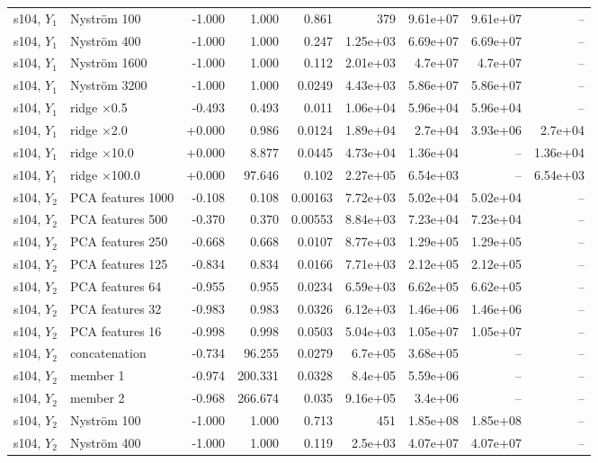 \begin{landscape}
{\begin{longtable}{llrrrrrrr}
s104, $Y_1$ & Nystr\"om 100 & -1.000 & 1.000 & 0.861 & 379 & 9.61e+07 & 9.61e+07 & -- \\
s104, $Y_1$ & Nystr\"om 400 & -1.000 & 1.000 & 0.247 & 1.25e+03 & 6.69e+07 & 6.69e+07 & -- \\
s104, $Y_1$ & Nystr\"om 1600 & -1.000 & 1.000 & 0.112 & 2.01e+03 & 4.7e+07 & 4.7e+07 & -- \\
s104, $Y_1$ & Nystr\"om 3200 & -1.000 & 1.000 & 0.0249 & 4.43e+03 & 5.86e+07 & 5.86e+07 & -- \\
s104, $Y_1$ & ridge $\times$0.5 & -0.493 & 0.493 & 0.011 & 1.06e+04 & 5.96e+04 & 5.96e+04 & -- \\
s104, $Y_1$ & ridge $\times$2.0 & +0.000 & 0.986 & 0.0124 & 1.89e+04 & 2.7e+04 & 3.93e+06 & 2.7e+04 \\
s104, $Y_1$ & ridge $\times$10.0 & +0.000 & 8.877 & 0.0445 & 4.73e+04 & 1.36e+04 & -- & 1.36e+04 \\
s104, $Y_1$ & ridge $\times$100.0 & +0.000 & 97.646 & 0.102 & 2.27e+05 & 6.54e+03 & -- & 6.54e+03 \\
s104, $Y_2$ & PCA features 1000 & -0.108 & 0.108 & 0.00163 & 7.72e+03 & 5.02e+04 & 5.02e+04 & -- \\
s104, $Y_2$ & PCA features 500 & -0.370 & 0.370 & 0.00553 & 8.84e+03 & 7.23e+04 & 7.23e+04 & -- \\
s104, $Y_2$ & PCA features 250 & -0.668 & 0.668 & 0.0107 & 8.77e+03 & 1.29e+05 & 1.29e+05 & -- \\
s104, $Y_2$ & PCA features 125 & -0.834 & 0.834 & 0.0166 & 7.71e+03 & 2.12e+05 & 2.12e+05 & -- \\
s104, $Y_2$ & PCA features 64 & -0.955 & 0.955 & 0.0234 & 6.59e+03 & 6.62e+05 & 6.62e+05 & -- \\
s104, $Y_2$ & PCA features 32 & -0.983 & 0.983 & 0.0326 & 6.12e+03 & 1.46e+06 & 1.46e+06 & -- \\
s104, $Y_2$ & PCA features 16 & -0.998 & 0.998 & 0.0503 & 5.04e+03 & 1.05e+07 & 1.05e+07 & -- \\
s104, $Y_2$ & concatenation & -0.734 & 96.255 & 0.0279 & 6.7e+05 & 3.68e+05 & -- & -- \\
s104, $Y_2$ & member 1 & -0.974 & 200.331 & 0.0328 & 8.4e+05 & 5.59e+06 & -- & -- \\
s104, $Y_2$ & member 2 & -0.968 & 266.674 & 0.035 & 9.16e+05 & 3.4e+06 & -- & -- \\
s104, $Y_2$ & Nystr\"om 100 & -1.000 & 1.000 & 0.713 & 451 & 1.85e+08 & 1.85e+08 & -- \\
s104, $Y_2$ & Nystr\"om 400 & -1.000 & 1.000 & 0.119 & 2.5e+03 & 4.07e+07 & 4.07e+07 & -- \\

\end{longtable}}
\end{landscape}
